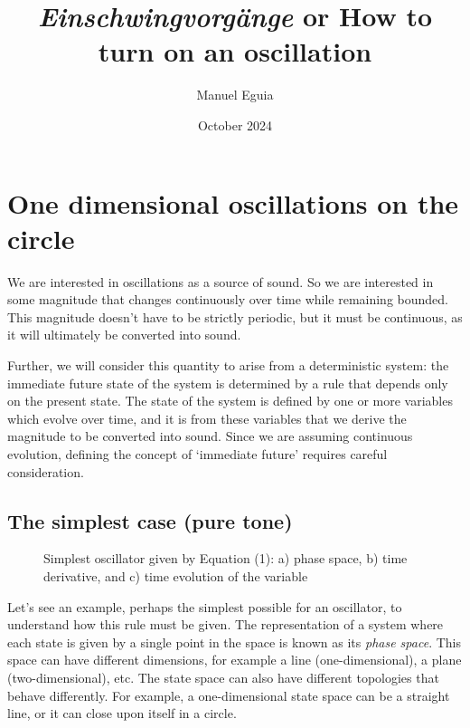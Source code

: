\documentclass{article}
\title{{\em Einschwingvorgänge} or How to turn on an oscillation}
\author{Manuel Eguia}
\date{October 2024}
\begin{document}
\maketitle

\section{One dimensional oscillations on the circle}
We are interested in oscillations as a source of sound. So we are interested in some magnitude that changes continuously over time while remaining bounded. 
This magnitude doesn’t have to be strictly periodic, but it must be continuous, as it will ultimately be converted into sound.

Further, we will consider this quantity to arise from a deterministic system: the immediate future state of the system is determined by a rule that depends only on the present state. 
The state of the system is defined by one or more variables which evolve over time, and it is from these variables that we derive the magnitude to be converted into sound. 
Since we are assuming continuous evolution, defining the concept of `immediate future' requires careful consideration.



\subsection{The simplest case (pure tone)}

\begin{figure} [h]
    \centering
    \caption{Simplest oscillator given by Equation (1): a) phase space, b) time derivative, and c) time evolution of the variable} 
    \label{fig_pure}
\end{figure}

Let's see an example, perhaps the simplest possible for an oscillator, to understand how this rule must be given. The representation of a system where each state is given by a single point in the space is known as its {\em phase space}. This space can have different dimensions, for example a line (one-dimensional), a plane (two-dimensional), etc. The state space can also have different topologies that behave differently. For example, a one-dimensional state space can be a straight line, or it can close upon itself in a circle.
\end{document}
